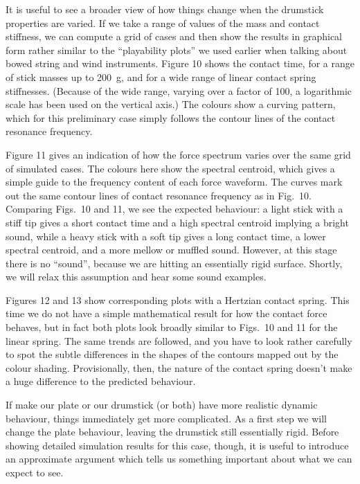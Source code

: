  It is useful to see a broader view of how things change when the drumstick 
  properties are varied. If we take a range of values of the mass and contact 
  stiffness, we can compute a grid of cases and then show the results in 
  graphical form rather similar to the “playability plots” we used earlier when 
  talking about bowed string and wind instruments. Figure 10 shows the contact 
  time, for a range of stick masses up to 200~g, and for a wide range of linear 
  contact spring stiffnesses. (Because of the wide range, varying over a factor 
  of 100, a logarithmic scale has been used on the vertical axis.) The colours 
  show a curving pattern, which for this preliminary case simply follows the 
  contour lines of the contact resonance frequency. 

  Figure 11 gives an indication of how the force spectrum varies over the same 
  grid of simulated cases. The colours here show the spectral centroid, which 
  gives a simple guide to the frequency content of each force waveform. The 
  curves mark out the same contour lines of contact resonance frequency as in 
  Fig.\ 10. Comparing Figs.\ 10 and 11, we see the expected behaviour: a light 
  stick with a stiff tip gives a short contact time and a high spectral 
  centroid implying a bright sound, while a heavy stick with a soft tip gives a 
  long contact time, a lower spectral centroid, and a more mellow or muffled 
  sound. However, at this stage there is no ``sound'', because we are hitting 
  an essentially rigid surface. Shortly, we will relax this assumption and hear 
  some sound examples. 

  Figures 12 and 13 show corresponding plots with a Hertzian contact spring. 
  This time we do not have a simple mathematical result for how the contact 
  force behaves, but in fact both plots look broadly similar to Figs.\ 10 and 
  11 for the linear spring. The same trends are followed, and you have to look 
  rather carefully to spot the subtle differences in the shapes of the contours 
  mapped out by the colour shading. Provisionally, then, the nature of the 
  contact spring doesn’t make a huge difference to the predicted behaviour. 


  If make our plate or our drumstick (or both) have more realistic dynamic 
  behaviour, things immediately get more complicated. As a first step we will 
  change the plate behaviour, leaving the drumstick still essentially rigid. 
  Before showing detailed simulation results for this case, though, it is 
  useful to introduce an approximate argument which tells us something 
  important about what we can expect to see. 

